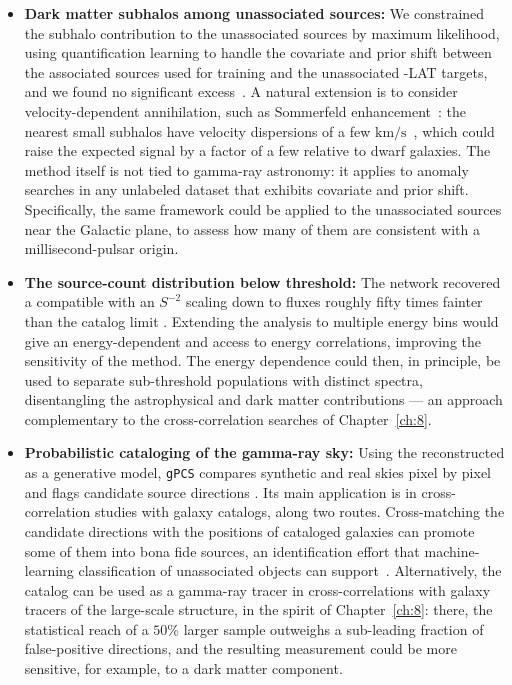 \begin{itemize}
    \item \textbf{Dark matter subhalos among unassociated sources:} We
    constrained the subhalo contribution to the unassociated sources by maximum
    likelihood, using quantification learning to handle the covariate and prior
    shift between the associated sources used for training and the unassociated \Fermi-LAT
    targets, and we found no significant excess~\cite{Amerio:2025fhz}. A natural extension is to consider velocity-dependent
    annihilation, such as Sommerfeld enhancement~\cite{ArkaniHamed:2008qn}:
    the nearest small subhalos have velocity dispersions of a few
    $\mathrm{km/s}$~\cite{2024MNRAS.530.2496A}, which could raise the
    expected signal by a factor of a few relative to dwarf galaxies.
    The method itself is not tied to
    gamma-ray astronomy: it applies to anomaly searches in any unlabeled
    dataset that exhibits covariate and prior shift. Specifically, the same
    framework could be applied to the unassociated sources near the Galactic
    plane, to assess how many of them are consistent with a millisecond-pulsar
    origin.

    \item \textbf{The source-count distribution below threshold:} The network
    recovered a \dnds{} compatible with an $S^{-2}$ scaling down to fluxes
    roughly fifty times fainter than the catalog limit
    \cite{Amerio:2023uet}. Extending the analysis to multiple energy bins would
    give an energy-dependent \dnds{} and access to energy correlations,
    improving the sensitivity of the method. The energy dependence could then, in
    principle, be used to separate sub-threshold populations with distinct
    spectra, disentangling the astrophysical and dark matter
    contributions --- an approach complementary to the cross-correlation
    searches of Chapter~\ref{ch:8}.
    
    

    \item \textbf{Probabilistic cataloging of the gamma-ray sky:} Using the
    reconstructed \dnds{} as a generative model, \texttt{gPCS} compares synthetic and
    real skies pixel by pixel and flags candidate source directions
    \cite{Amerio:2023rjn}. Its main application is in cross-correlation studies
    with galaxy catalogs, along two routes. Cross-matching the candidate
    directions with the positions of cataloged galaxies can promote some of
    them into bona fide sources, an identification effort that machine-learning
    classification of unassociated objects can support~\cite{Bhat:2022}.
    Alternatively, the catalog can be used as a gamma-ray tracer in
    cross-correlations with galaxy tracers of the large-scale structure, in the
    spirit of Chapter~\ref{ch:8}: there, the statistical reach of a $50\%$
    larger sample outweighs a sub-leading fraction of false-positive directions, and
    the resulting measurement could be more sensitive, for example, to a dark
    matter component.


\end{itemize}
